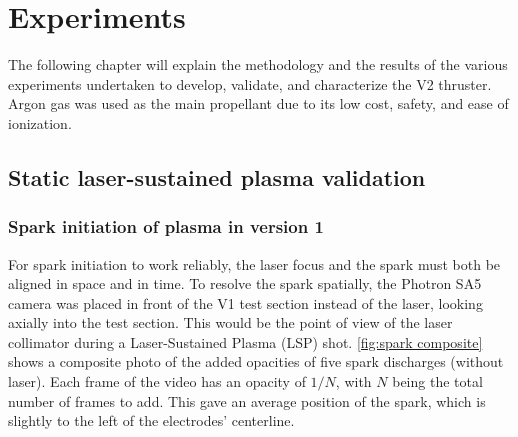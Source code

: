 \chapter{Experiments}

    The following chapter will explain the methodology and the results of the various experiments undertaken to develop, validate, and characterize the V2 thruster. Argon gas was used as the main propellant due to its low cost, safety, and ease of ionization.

    \section{Static laser-sustained plasma validation}

        \subsection{Spark initiation of plasma in version 1}

            For spark initiation to work reliably, the laser focus and the spark must both be aligned in space and in time. To resolve the spark spatially, the Photron SA5 camera was placed in front of the V1 test section instead of the laser, looking axially into the test section. This would be the point of view of the laser collimator during a Laser-Sustained Plasma (LSP) shot. \autoref{fig:spark composite} shows a composite photo of the added opacities of five spark discharges (without laser). Each frame of the video has an opacity of $1/N$, with $N$ being the total number of frames to add. This gave an average position of the spark, which is slightly to the left of the electrodes' centerline.

